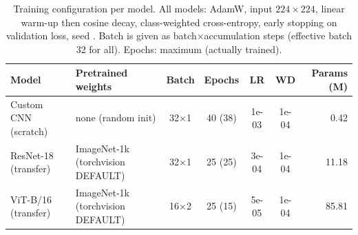 \begin{table}[H]\centering\small
\caption{Training configuration per model. All models: AdamW, input $224\times224$, linear warm-up then cosine decay, class-weighted cross-entropy, early stopping on validation loss, seed \Seed. Batch is given as batch$\times$accumulation steps (effective batch 32 for all). Epochs: maximum (actually trained).}\label{tab:hparams}
\begin{tabular}{p{3.1cm}p{3.2cm}cccc r}\toprule
Model & Pretrained weights & Batch & Epochs & LR & WD & Params (M) \\\midrule
Custom CNN (scratch) & none (random init) & 32$\times$1 & 40 (38) & 1e-03 & 1e-04 & 0.42 \\
ResNet-18 (transfer) & ImageNet-1k (torchvision DEFAULT) & 32$\times$1 & 25 (25) & 3e-04 & 1e-04 & 11.18 \\
ViT-B/16 (transfer) & ImageNet-1k (torchvision DEFAULT) & 16$\times$2 & 25 (15) & 5e-05 & 1e-04 & 85.81 \\
\bottomrule\end{tabular}\end{table}